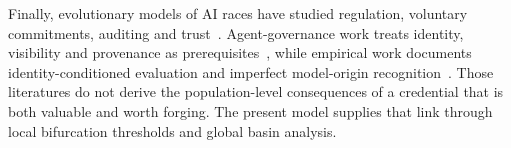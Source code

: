 Finally, evolutionary models of AI races have studied regulation, voluntary
commitments, auditing and trust~\citep{han2020regulate,han2022voluntary,bova2024vigilant}.
Agent-governance work treats identity, visibility and provenance as
prerequisites~\citep{chan2024visibility,chan2025infrastructure,otsuka2026aiidentity},
while empirical work documents identity-conditioned evaluation and imperfect
model-origin recognition~\citep{panickssery2024llm,sun2025idiosyncrasies,wang2026outgroup}.
Those literatures do not derive the population-level consequences of a
credential that is both valuable and worth forging. The present model supplies
that link through local bifurcation thresholds and global basin analysis.
